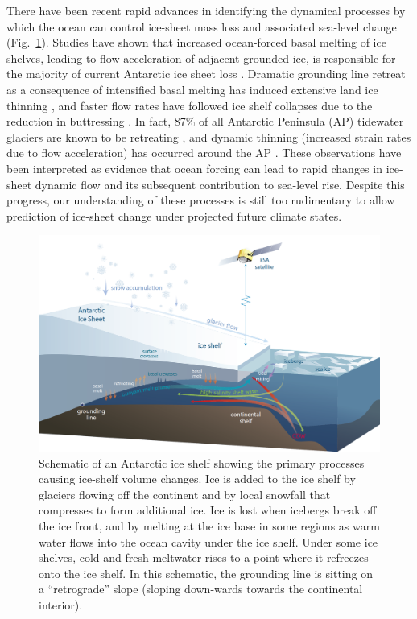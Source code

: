 There have been recent rapid advances in identifying the dynamical processes by which the
ocean can control ice-sheet mass loss and associated sea-level change (Fig.~\ref{fig:ice-shelf-schematic}). Studies have shown that
increased ocean-forced basal melting of ice shelves, leading to flow acceleration of adjacent grounded ice,
is responsible for the majority of current Antarctic ice sheet loss \parencite{Rignot2008,
Pritchard2009}. Dramatic grounding line retreat as a consequence
of intensified basal melting has induced extensive land ice thinning \parencite{Wingham2009,
Pritchard2009, Rignot2014}, and faster flow rates have followed ice shelf collapses
due to the reduction in buttressing \parencite{Rignot2004, Scambos2004}.
In fact, 87\% of all Antarctic Peninsula (AP) tidewater glaciers are known to be retreating
\parencite{Cook2005}, and dynamic thinning (increased strain rates due to flow acceleration)
has occurred around the AP \parencite{Rignot2008, Pritchard2009}.
These observations have been interpreted as evidence that
ocean forcing can lead to rapid changes in ice-sheet dynamic flow and its subsequent
contribution to sea-level rise. Despite this progress, our understanding of these processes
is still too rudimentary to allow prediction of ice-sheet change under projected
future climate states.


\begin{figure}[!ht]
  \centering
  \includegraphics[width=.9\textwidth]{img/ice_shelf_diagram.png}
  \caption[Schematic of ice-shelf/ocean interaction]{
Schematic of an Antarctic ice shelf showing the primary processes causing ice-shelf volume changes. Ice is added to the ice shelf by glaciers flowing off the continent and by local snowfall that compresses to form additional ice. Ice is lost when icebergs break off the ice front, and by melting at the ice base in some regions as warm water flows into the ocean cavity under the ice shelf. Under some ice shelves, cold and fresh meltwater rises to a point where it refreezes onto the ice shelf. In this schematic, the grounding line is sitting on a ``retrograde'' slope (sloping down-wards towards the continental interior).
  }
  \label{fig:ice-shelf-schematic}
\end{figure}


